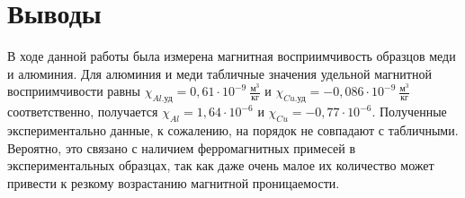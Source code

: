 \documentclass[a4paper, 12pt]{article}
\begin{document}
	\section*{Выводы}
	
	В ходе данной работы была измерена магнитная восприимчивость образцов меди и алюминия. Для алюминия и меди табличные значения удельной магнитной восприимчивости равны $ \chi_{Al.\text{уд}} = 0,61\cdot 10^{-9} \ \frac{\text{м}^3}{\text{кг}}$ и $ \chi_{Cu.\text{уд}} = -0,086 \cdot 10^{-9} \ \frac{\text{м}^3}{\text{кг}} $ соответственно, получается $\chi_{Al} = 1,64 \cdot 10^{-6}$ и $\chi_{Cu} = -0,77 \cdot 10^{-6}$. Полученные экспериментально данные, к сожалению, на порядок не совпадают с табличными. Вероятно, это связано с наличием ферромагнитных примесей в экспериментальных образцах, так как даже очень малое их количество может привести к резкому возрастанию магнитной проницаемости.
	
\end{document}
